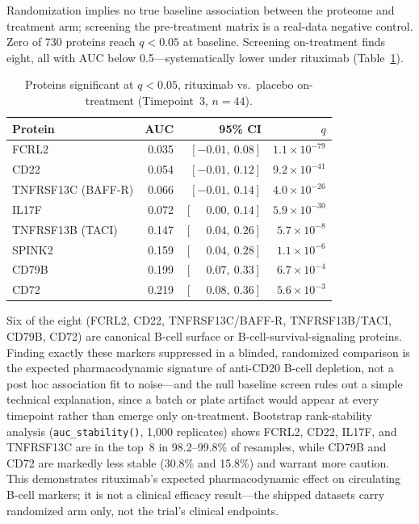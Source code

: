 \documentclass[11pt,a4paper]{article}
\begin{document}
Randomization implies no true baseline association between the proteome and
treatment arm; screening the pre-treatment matrix is a real-data negative
control.  Zero of 730 proteins reach $q < 0.05$ at baseline.  Screening
on-treatment finds eight, all with AUC below 0.5---systematically lower
under rituximab (Table~\ref{tab:beatmg}).

\begin{table}[htbp]
\centering
\caption{Proteins significant at $q < 0.05$, rituximab vs.\ placebo
         on-treatment (Timepoint~3, $n = 44$).}\label{tab:beatmg}
\begin{tabular}{lrrr}
\toprule
Protein & AUC & 95\% CI & $q$ \\
\midrule
FCRL2                & 0.035 & $[-0.01,\ 0.08]$ & $1.1 \times 10^{-79}$ \\
CD22                 & 0.054 & $[-0.01,\ 0.12]$ & $9.2 \times 10^{-41}$ \\
TNFRSF13C (BAFF-R)   & 0.066 & $[-0.01,\ 0.14]$ & $4.0 \times 10^{-26}$ \\
IL17F                & 0.072 & $[\phantom{-}0.00,\ 0.14]$ & $5.9 \times 10^{-30}$ \\
TNFRSF13B (TACI)     & 0.147 & $[\phantom{-}0.04,\ 0.26]$ & $5.7 \times 10^{-8}$  \\
SPINK2               & 0.159 & $[\phantom{-}0.04,\ 0.28]$ & $1.1 \times 10^{-6}$  \\
CD79B                & 0.199 & $[\phantom{-}0.07,\ 0.33]$ & $6.7 \times 10^{-4}$  \\
CD72                 & 0.219 & $[\phantom{-}0.08,\ 0.36]$ & $5.6 \times 10^{-3}$  \\
\bottomrule
\end{tabular}
\end{table}

Six of the eight (FCRL2, CD22, TNFRSF13C/BAFF-R, TNFRSF13B/TACI, CD79B,
CD72) are canonical B-cell surface or B-cell-survival-signaling proteins.
Finding exactly these markers suppressed in a blinded, randomized comparison
is the expected pharmacodynamic signature of anti-CD20 B-cell depletion, not
a post hoc association fit to noise---and the null baseline screen rules out
a simple technical explanation, since a batch or plate artifact would appear
at every timepoint rather than emerge only on-treatment.  Bootstrap
rank-stability analysis (\texttt{auc\_stability()}, 1{,}000 replicates) shows
FCRL2, CD22, IL17F, and TNFRSF13C are in the top~8 in
98.2--99.8\% of resamples, while CD79B and CD72 are markedly less stable
(30.8\% and 15.8\%) and warrant more caution.  This demonstrates rituximab's
expected pharmacodynamic effect on circulating B-cell markers; it is not a
clinical efficacy result---the shipped datasets carry randomized arm only,
not the trial's clinical endpoints.
\end{document}
